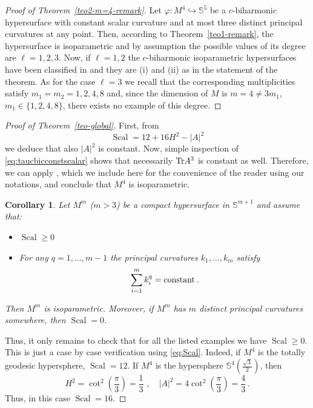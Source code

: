 \documentclass[11pt,leqno]{amsart}
\theoremstyle{plain}
\newtheorem{corollary}    [theorem]  {Corollary}
\theoremstyle{definition}
\numberwithin{equation}{section}
\def \s{{\mathbb S}}
\newcommand{\Scal}{\operatorname{Scal}}
\numberwithin{equation}{section}
\begin{document}
{\begin{proof}[Proof of Theorem~\ref{teo2-m=4-remark}] Let $\varphi:M^{4}\hookrightarrow\s^5$ be a $c$-biharmonic hypersurface with constant scalar curvature and at most three distinct principal curvatures at any point. Then, according to Theorem~\ref{teo1-remark}, the hypersurface is isoparametric and by assumption the possible values of its degree are $\ell=1,2,3$. Now, if $\ell=1,2$ the $c$-biharmonic isoparametric hypersurfaces have been classified in \cite{arXiv:2311.04493} and they are (i) and (ii) as in the statement of the theorem. As for the case $\ell=3$ we recall that the corresponding multiplicities satisfy $m_1=m_2=1,2,4,8$ and, since the dimension of $M$ is $m=4\neq 3 m_1$, $m_1\in\{1,2,4,8\}$, there exists no example of this degree.  
\end{proof}
\begin{proof}[Proof of Theorem~\ref{teo-global}] First, from
\begin{equation}\label{eq:Scal}
\Scal=12+16 H^2-|A|^2
\end{equation}
we deduce that also $|A|^2$ is constant. Now, simple inspection of \eqref{eq:taucbicconstscalar} shows that necessarily ${\rm Tr}A^3$ is constant as well. Therefore, we can apply \cite[Corollary 1.2]{MR4529031}, which we include here for the convenience of the reader using our notations, and conclude that $M^4$ is isoparametric. 

\begin{corollary}\label{Cor-Tang}\cite[Corollary 1.2]{MR4529031} Let $M^m$ ($m>3$) be a compact hypersurface in $\s^{m+1}$ and assume that:
\begin{itemize}
\item[(a)] $\Scal\geq 0$ 
\item[(b)] For any $q=1,\ldots,m-1$ the principal curvatures $k_1, \dots, k_m$ satisfy 
\[
\sum_{i=1}^m k_i^q ={\rm constant}\,.
\] 
\end{itemize}
Then $M^m$ is isoparametric. Moreover, if $M^m$ has $m$ distinct principal curvatures somewhere, then $\Scal= 0$.

\end{corollary}


Thus, it only remains to check that for all the listed examples we have $\Scal\geq 0$. This is just a case by case verification using \eqref{eq:Scal}. Indeed, if $M^4$ is the totally geodesic hypersphere, $\Scal=12$. If $M^4$ is the hypersphere $\s^4\left( \frac{\sqrt 3}{2}\right)$, then
\[
H^2= \cot^2\left(\frac{\pi}{3}\right)=\frac{1}{3}\,\,,\quad |A|^2=4 \cot^2\left(\frac{\pi}{3}\right)=\frac{4}{3}\,.
\]
Thus, in this case $\Scal=16$. 


\end{proof}}
\end{document}
